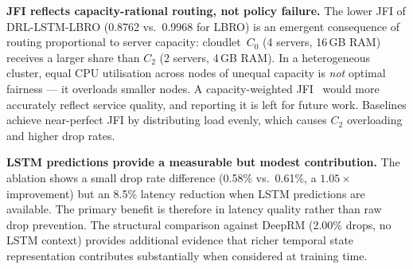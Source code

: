 \textbf{JFI reflects capacity-rational routing, not policy
failure.} The lower JFI of DRL-LSTM-LBRO (0.8762 vs.\
0.9968 for LBRO) is an emergent consequence of routing
proportional to server capacity: cloudlet~$C_0$ (4 servers,
16\,GB RAM) receives a larger share than $C_2$ (2 servers,
4\,GB RAM). In a heterogeneous cluster, equal CPU utilisation
across nodes of unequal capacity is \emph{not} optimal
fairness --- it overloads smaller nodes. A capacity-weighted
JFI~\cite{nayyer2022lbro} would more accurately reflect
service quality, and reporting it is left for future work.
Baselines achieve near-perfect JFI by distributing load
evenly, which causes $C_2$ overloading and higher drop rates.

\textbf{LSTM predictions provide a measurable but modest
contribution.} The ablation shows a small drop rate difference
(0.58\% vs.\ 0.61\%, a $1.05\times$ improvement) but an 8.5\%
latency reduction when LSTM predictions are available.
The primary benefit is therefore in latency quality rather
than raw drop prevention. The structural comparison against
DeepRM (2.00\% drops, no LSTM context) provides additional
evidence that richer temporal state representation contributes
substantially when considered at training time.
